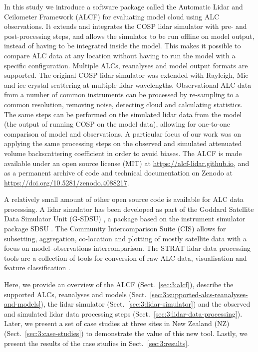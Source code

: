 In this study we introduce a software package called the Automatic Lidar and Ceilometer
Framework (ALCF) for evaluating model cloud using ALC observations. It extends
and integrates the COSP lidar simulator \citep{chiriaco2006,chepfer2007,chepfer2008} with
pre- and post-processing steps, and allows the simulator to be run offline
on model output, instead of having to be integrated inside
the model. This makes it possible to compare ALC data at any location
without having to run the model with a specific configuration.
Multiple ALCs, reanalyses and model output formats are supported.
The original COSP lidar simulator was extended with Rayleigh, Mie and ice crystal scattering
at multiple lidar wavelengths. Observational ALC data from a number of common instruments can
be processed by re-sampling to a common resolution, removing noise, detecting cloud
and calculating statistics. The same steps can be performed on the simulated lidar data
from the model (the output of running COSP on the model data),
allowing for one-to-one comparison of model and observations.
A particular focus of our work was on applying the same processing steps on the
observed and simulated attenuated volume backscattering coefficient in order to
avoid biases. The ALCF is made available under an open source license (MIT)
at \url{https://alcf-lidar.github.io}, and as a permanent archive
of code and technical documentation on Zenodo at
\url{https://doi.org/10.5281/zenodo.4088217}.

A relatively small amount of other open source code is available for
ALC data processing. A lidar simulator has been developed as part of the Goddard
Satellite Data Simulator Unit (G-SDSU) \citep{G-SDSU}, a package based on the
instrument simulator package SDSU \citep{masunaga2010}. The Community
Intercomparison Suite (CIS) \citep{watson2016} allows for subsetting,
aggregation, co-location and plotting of mostly satellite
data with a focus on model--observations intercomparison. The STRAT lidar
data processing tools
are a collection of tools for conversion of raw ALC data, visualisation and feature
classification \citep{morille2007}.

Here, we provide an overview of the ALCF (Sect.~\ref{sec:3:alcf}), describe
the supported ALCs, reanalyses and models (Sect.~\ref{sec:3:supported-alcs-reanalyses-and-models}),
the lidar simulator (Sect.~\ref{sec:3:lidar-simulator}) and the observed and simulated lidar data processing steps (Sect.~\ref{sec:3:lidar-data-processing}). Later, we present a set of case studies at three sites in New Zealand (NZ)
(Sect.~\ref{sec:3:case-studies}) to demonstrate the value of this new tool.
Lastly, we present the results of the case studies in Sect.~\ref{sec:3:results}.

